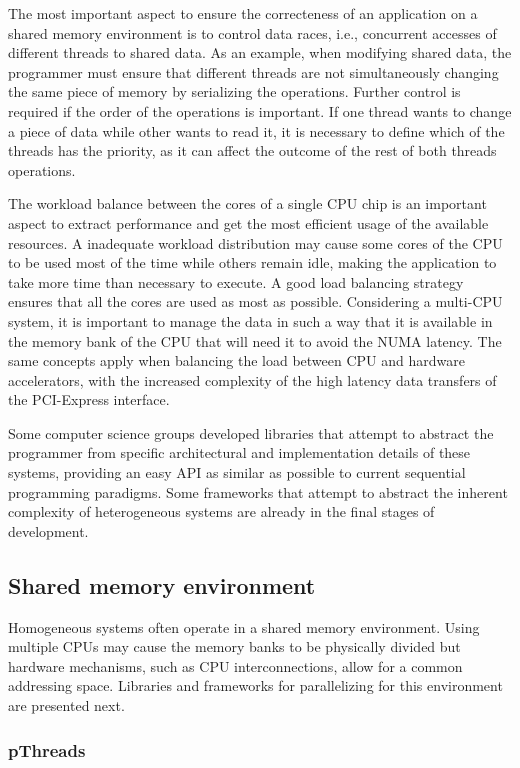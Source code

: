 The most important aspect to ensure the correcteness of an application on a shared memory environment is to control data races, i.e., concurrent accesses of different threads to shared data. As an example, when modifying shared data, the programmer must ensure that different threads are not simultaneously changing the same piece of memory by serializing the operations. Further control is required if the order of the operations is important. If one thread wants to change a piece of data while other wants to read it, it is necessary to define which of the threads has the priority, as it can affect the outcome of the rest of both threads operations.

The workload balance between the cores of a single CPU chip is an important aspect to extract performance and get the most efficient usage of the available resources. A inadequate workload distribution may cause some cores of the CPU to be used most of the time while others remain idle, making the application to take more time than necessary to execute. A good load balancing strategy ensures that all the cores are used as most as possible. Considering a multi-CPU system, it is important to manage the data in such a way that it is available in the memory bank of the CPU that will need it to avoid the NUMA latency. The same concepts apply when balancing the load between CPU and hardware accelerators, with the increased complexity of the high latency data transfers of the PCI-Express interface.

Some computer science groups developed libraries that attempt to abstract the programmer from specific architectural and implementation details of these systems, providing an easy API as similar as possible to current sequential programming paradigms. Some frameworks that attempt to abstract the inherent complexity of heterogeneous systems are already in the final stages of development.

\subsection{Shared memory environment}

Homogeneous systems often operate in a shared memory environment. Using multiple CPUs may cause the memory banks to be physically divided but hardware mechanisms, such as CPU interconnections, allow for a common addressing space. Libraries and frameworks for parallelizing for this environment are presented next.

\subsubsection*{pThreads}
\label{pThreads}

